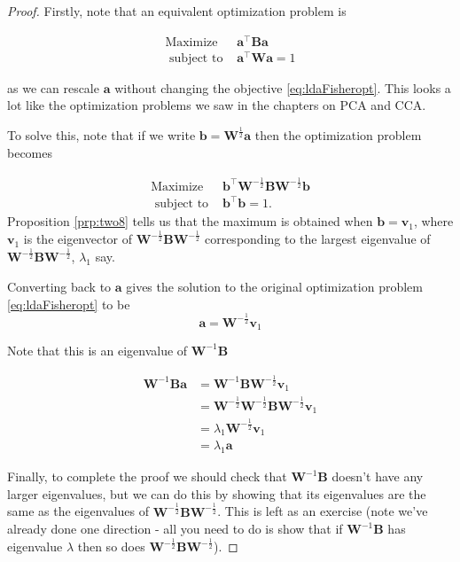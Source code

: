 \documentclass[
]{book}
\theoremstyle{definition}
\theoremstyle{definition}
\theoremstyle{definition}
\theoremstyle{definition}
\theoremstyle{remark}
\begin{document}
\begin{proof}
Firstly, note that an equivalent optimization problem is

\begin{align*}
\mbox{Maximize } &\mathbf a^\top \mathbf B\mathbf a\\
 \mbox{ subject to } &\mathbf a^\top \mathbf W\mathbf a=1
\end{align*}

as we can rescale \(\mathbf a\) without changing the objective \eqref{eq:ldaFisheropt}. This looks a lot like the optimization problems we saw in the chapters on PCA and CCA.

To solve this, note that if we write \(\mathbf b=\mathbf W^{\frac{1}{2}}\mathbf a\) then the optimization problem becomes

\begin{align*}
\mbox{Maximize } &\mathbf b^\top \mathbf W^{-\frac{1}{2}}\mathbf B\mathbf W^{-\frac{1}{2}}\mathbf b\\
 \mbox{ subject to } &\mathbf b^\top \mathbf b=1.
\end{align*}
Proposition \ref{prp:two8} tells us that the maximum is obtained when \(\mathbf b=\mathbf v_1\), where \(\mathbf v_1\) is the eigenvector of \(\mathbf W^{-\frac{1}{2}}\mathbf B\mathbf W^{-\frac{1}{2}}\) corresponding to the largest eigenvalue of \(\mathbf W^{-\frac{1}{2}}\mathbf B\mathbf W^{-\frac{1}{2}}\), \(\lambda_1\) say.

Converting back to \(\mathbf a\) gives the solution to the original optimization problem \eqref{eq:ldaFisheropt} to be
\[\mathbf a= \mathbf W^{-\frac{1}{2}}\mathbf v_1\]

Note that this is an eigenvalue of \(\mathbf W^{-1}\mathbf B\)

\begin{align*}
\mathbf W^{-1}\mathbf B\mathbf a&= \mathbf W^{-1}\mathbf B\mathbf W^{-\frac{1}{2}}\mathbf v_1 \\
&= \mathbf W^{-\frac{1}{2}}\mathbf W^{-\frac{1}{2}}\mathbf B\mathbf W^{-\frac{1}{2}}\mathbf v_1\\
&= \lambda_1\mathbf W^{-\frac{1}{2}}\mathbf v_1\\
&= \lambda_1 \mathbf a
\end{align*}

Finally, to complete the proof we should check that \(\mathbf W^{-1}\mathbf B\) doesn't have any larger eigenvalues, but we can do this by showing that its eigenvalues are the same as the eigenvalues of \(\mathbf W^{-\frac{1}{2}}\mathbf B\mathbf W^{-\frac{1}{2}}\). This is left as an exercise (note we've already done one direction - all you need to do is show that if \(\mathbf W^{-1}\mathbf B\) has eigenvalue \(\lambda\) then so does \(\mathbf W^{-\frac{1}{2}}\mathbf B\mathbf W^{-\frac{1}{2}}\)).
\end{proof}
\end{document}
